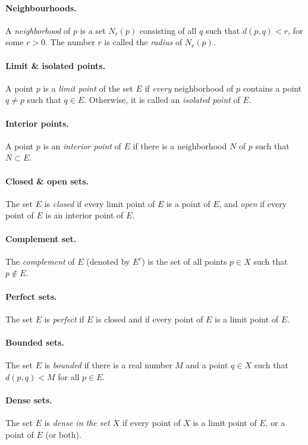 \documentclass{article}
\numberwithin{theorem}{section}
\begin{document}
\paragraph{Neighbourhoods.} A \emph{neighborhood} of $p$ is a set $N_r(p)$
consisting of all $q$ such that $d(p, q) < r$, for some $r > 0$. The number $r$
is called the \emph{radius} of $N_r(p)$.

\paragraph{Limit \& isolated points.} A point $p$ is a \emph{limit point} of the
set $E$ if \emph{every} neighborhood of $p$ contains a point $q \neq p$ such
that $q \in E$. Otherwise, it is called an \emph{isolated point} of $E$.

\paragraph{Interior points.} A point $p$ is an \emph{interior point} of $E$ if
there is a neighborhood $N$ of $p$ such that $N \subset E$.

\paragraph{Closed \& open sets.} The set $E$ is \emph{closed} if every limit
point of $E$ is a point of $E$, and \emph{open} if every point of $E$ is an
interior point of $E$.

\paragraph{Complement set.} The \emph{complement} of $E$ (denoted by $E^c$)
is the set of all points $p \in X$ such that $p \notin E$.

\paragraph{Perfect sets.} The set $E$ is \emph{perfect} if $E$ is closed and if
every point of $E$ is a limit point of $E$.

\paragraph{Bounded sets.} The set $E$ is \emph{bounded} if there is a real
number $M$ and a point $q \in X$ such that $d(p, q) < M$ for all $p \in E$.

\paragraph{Dense sets.} The set $E$ is \emph{dense in the set $X$} if every
point of $X$ is a limit point of $E$, or a point of $E$ (or both).
\end{document}
